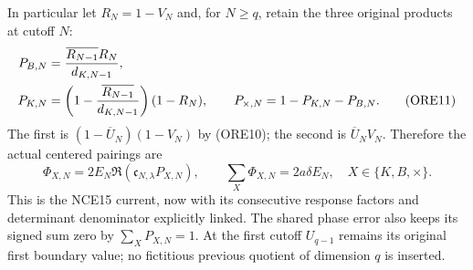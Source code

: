 In particular let $R_N=1-V_N$ and, for $N\ge q$, retain the three
original products at cutoff $N$:
\begin{align}
 P_{B,N}&=\frac{\overline{R_{N-1}}R_N}{d_{K,N-1}},\notag\\
 P_{K,N}&=\left(1-\frac{\overline{R_{N-1}}}{d_{K,N-1}}\right)(1-R_N),
 \qquad P_{\times,N}=1-P_{K,N}-P_{B,N}.                \tag{ORE11}
\end{align}
The first is $(1-\overline U_N)(1-V_N)$ by (ORE10); the second
is $\overline U_NV_N$. Therefore the actual centered pairings are
\begin{equation}\tag{ORE12}
 \Phi_{X,N}=2E_N\Re(\mathfrak c_{N,\lambda}P_{X,N}),\qquad
 \sum_X\Phi_{X,N}=2a\delta E_N,
 \quad X\in\{K,B,\times\}.
\end{equation}
This is the NCE15 current, now with its consecutive response factors
and determinant denominator explicitly linked. The shared phase error
also keeps its signed sum zero by $\sum_XP_{X,N}=1$.
At the first cutoff $U_{q-1}$ remains its original first boundary value;
no fictitious previous quotient of dimension $q$ is inserted.

